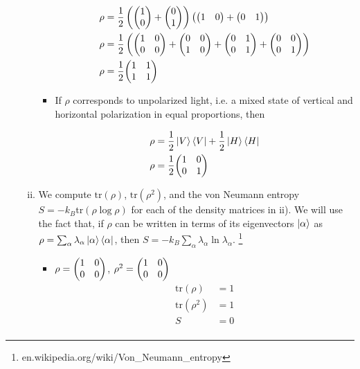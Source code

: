 \documentclass[]{article}
\begin{document}
\begin{enumerate}[1)]
\begin{enumerate}[i)]
\begin{itemize}
\begin{equation}
\begin{split}
\rho & = \frac{1}{2} \left(\mqty(1 \\ 0) + \mqty( 0 \\ 1) \right) \left( \mqty(1 & 0) + \mqty( 0 & 1)\right) \\
\rho & = \frac{1}{2} \left(\mqty(1 & 0 \\  0 & 0) + \mqty( 0 & 0 \\ 1 & 0) + \mqty( 0 & 1 \\ 0  & 1) + \mqty( 0 & 0 \\ 0 & 1)\right) \\
\rho & = \frac{1}{2} \mqty(1 & 1 \\  1 & 1)  \\
\end{split}
\end{equation}

\item If $\rho$ corresponds to unpolarized light, i.e. a mixed state of vertical and horizontal polarization in equal proportions, then 

\begin{equation}
\begin{split}
\rho & = \frac{1}{2} \ket{V}\bra{V} + \frac{1}{2}\ket{H}\bra{H} \\
\rho & = \frac{1}{2} \mqty( 1 & 0 \\ 0& 1) \\
\end{split}
\end{equation}

\end{itemize}


\item We compute $\text{tr}\left(\rho\right)$, $\text{tr}\left(\rho^2\right)$, and the von Neumann entropy $S = -k_B\text{tr}\left(\rho\log\rho\right)$ for each of the density matrices in ii).  We will use the fact that, if $\rho$ can be written in terms of its eigenvectors $\ket{\alpha}$ as $\rho=\sum_{\alpha}\lambda_\alpha\ket{\alpha}\bra{\alpha}$, then $S = -k_B\sum_{\alpha}\lambda_\alpha \ln\lambda_\alpha$. \footnote{en.wikipedia.org/wiki/Von\_Neumann\_entropy} \\
\begin{itemize}

\item $\rho = \mqty( 1 & 0 \\ 0 & 0 )$, $\rho^2 = \mqty( 1 & 0 \\ 0 & 0 ) $
\begin{equation}
\begin{split}
\text{tr}\left(\rho\right) &= 1 \\
\text{tr}\left(\rho^2\right) &= 1 \\
S & = 0 \\
\end{split}
\end{equation}


\end{itemize}
\end{enumerate}
\end{enumerate}
\end{document}
